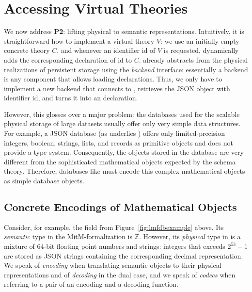 \section{Accessing Virtual Theories}\label{sec:access}

We now address \textbf{P2}: lifting physical to semantic representations.
Intuitively, it is straightforward how to implement a virtual theory $V$: we use an initially empty concrete theory $C$, and whenever an identifier \textsf{id} of $V$ is requested, \mmt dynamically adds the corresponding declaration of \textsf{id} to $C$.
\mmt already abstracts from the physical realizations of persistent storage using the \emph{backend} interface: essentially a backend is any component that allows loading declarations.
Thus, we only have to implement a new backend that connects to \lmfdb, retrieves the JSON object with identifier \textsf{id}, and turns it into an \ommt declaration.

However, this glosses over a major problem: the databases used for the scalable physical storage of large datasets usually offer only very simple data structures.
For example, a JSON database (as underlies \lmfdb) offers only limited-precision integers, boolean, strings, lists, and records as primitive objects and does not provide a type system.
Consequently, the objects stored in the database are very different from the sophisticated mathematical objects expected by the schema theory.
Therefore, databases like \lmfdb must encode this complex mathematical objects as simple database objects.

\subsection{Concrete Encodings of Mathematical Objects}\label{sec:vt:translation}

Consider, for example, the field  from Figure~\ref{fig:lmfdbexample} above.
Its \emph{semantic} type in the MitM-formalization is $\mathbb{Z}$.
However, its \emph{physical} type in \lmfdb is  a mixture of $64$-bit floating point numbers and strings:
integers that exceeds $2^{53}-1$ are stored as JSON strings containing the corresponding decimal representation.
We speak of \emph{encoding} when translating semantic objects to their physical representations and of \emph{decoding} in the dual case, and we speak of \emph{codecs} when referring to a pair of an encoding and a decoding function.

